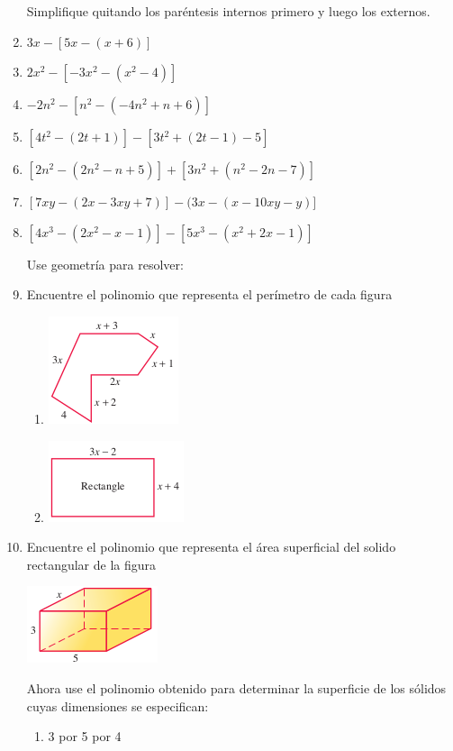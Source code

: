 \documentclass[letterpaper,11pt,twoside]{article}
\begin{document}
\begin{multicols}{2}
\begin{enumerate}
Simplifique quitando los paréntesis internos primero y luego los externos.

\item $3x-[5x-(x+6)]$
\item $2x^{2}-[-3x^{2}-(x^{2}-4)]$
\item $-2n^{2}-[n^{2}-(-4n^{2}+n+6)]$
\item $[4t^{2}-(2t+1)]-[3t^{2}+(2t-1)-5]$
\item $[2n^{2}-(2n^{2}-n+5)]+[3n^{2}+(n^{2}-2n-7)]$
\item $[7xy-(2x-3xy+7)]-(3x-(x-10xy-y)]$
\item $[4x^{3}-(2x^{2}-x-1)]-[5x^{3}-(x^{2}+2x-1)]$

Use geometría para resolver:

\item Encuentre el polinomio que representa el per\'{i}metro de cada figura
\begin{enumerate}
\item \includegraphics[scale=1]{Images/perimetro01.png}
\item \includegraphics[scale=1]{Images/perimetro02.png} 
\end{enumerate}
\item Encuentre el polinomio que representa el área superficial del solido rectangular de la figura
\begin{center}
\includegraphics[scale=1]{Images/solido01.png} 
\end{center}
Ahora use el polinomio obtenido para determinar la superficie de los sólidos cuyas dimensiones se especifican:
\begin{enumerate}
\item 3 por 5 por 4

\end{enumerate}
\end{enumerate}
\end{multicols}
\end{document}
